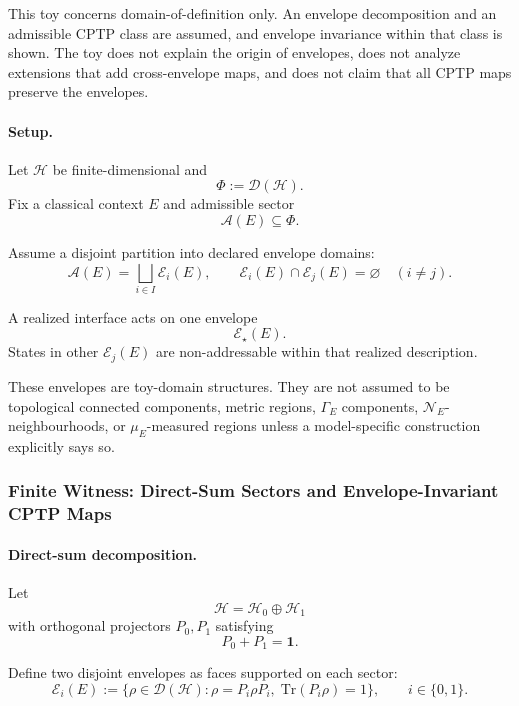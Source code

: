 \documentclass[aps,prx,onecolumn,11pt]{revtex4-2}
\theoremstyle{plain}
\theoremstyle{definition}
\theoremstyle{remark}
\begin{document}
This toy concerns domain-of-definition only. An envelope decomposition
and an admissible CPTP class are assumed, and envelope invariance within
that class is shown. The toy does not explain the origin of envelopes,
does not analyze extensions that add cross-envelope maps, and does not
claim that all CPTP maps preserve the envelopes.

\paragraph{Setup.}

Let \(\mathcal H\) be finite-dimensional and
\[
\Phi:=\mathcal D(\mathcal H).
\]
Fix a classical context \(E\) and admissible sector
\[
\mathcal A(E)\subseteq\Phi.
\]

Assume a disjoint partition into declared envelope domains:
\begin{equation}
\mathcal A(E)
=
\bigsqcup_{i\in I}\mathcal E_i(E),
\qquad
\mathcal E_i(E)\cap\mathcal E_j(E)=\varnothing
\quad
(i\neq j).
\label{eq:env_partition_strong}
\end{equation}

A realized interface acts on one envelope
\[
\mathcal E_\star(E).
\]
States in other \(\mathcal E_j(E)\) are non-addressable within that
realized description.

These envelopes are toy-domain structures. They are not assumed to be
topological connected components, metric regions, \(\Gamma_E\)
components, \(\mathcal N_E\)-neighbourhoods, or \(\mu_E\)-measured
regions unless a model-specific construction explicitly says so.

\subsubsection{Finite Witness: Direct-Sum Sectors and Envelope-Invariant CPTP Maps}
\label{subsubsec:env_witness_strong}

\paragraph{Direct-sum decomposition.}

Let
\[
\mathcal H=\mathcal H_0\oplus\mathcal H_1
\]
with orthogonal projectors \(P_0,P_1\) satisfying
\[
P_0+P_1=\mathbf 1.
\]

Define two disjoint envelopes as faces supported on each sector:
\begin{equation}
\mathcal E_i(E)
:=
\bigl\{
\rho\in\mathcal D(\mathcal H):
\rho=P_i\rho P_i,\;
\mathrm{Tr}(P_i\rho)=1
\bigr\},
\qquad
i\in\{0,1\}.
\label{eq:env_faces_strong}
\end{equation}
\end{document}
